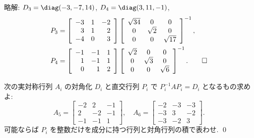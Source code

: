 \documentclass[12pt,twoside]{jarticle}
\newcommand\commentout[1]{#1}
\newcommand\commentout[1]{}
\begin{document}
\commentout{
\noindent
略解: $D_3=\diag(-3,-7,14)$, $D_4=\diag(3,11,-1)$, 
\begin{align*}
  &
  P_3 = 
  \left[ 
    \begin{array}{rrr}
      -3 & 1 & -2 \\
      3 & 1 & 2 \\
      -4 & 0 & 3
    \end{array}
  \right]
  \left[ 
    \begin{array}{ccc}
      \sqrt {34} & 0 & 0 \\
      0 & \sqrt {2} & 0 \\
      0 & 0 & \sqrt {17}
    \end{array}
  \right]^{-1},
  \\ &
  P_4 =
  \left[ 
    \begin{array}{rrr}
      -1 & -1 & 1 \\
      1 & -1 & 1 \\
      0 & 1 & 2
    \end{array}
  \right]
  \left[ 
    \begin{array}{ccc}
      \sqrt {2} & 0 & 0 \\
      0 & \sqrt {3} & 0 \\
      0 & 0 & \sqrt {6}
    \end{array}
  \right]^{-1}.
  \qed
\end{align*}
}


\begin{question}
\label{q:ars-3}
  次の実対称行列 $A_i$ の対角化 $D_i$ と直交行列 $P_i$ で $P_i^{-1}AP_i=D_i$ 
  となるもの求めよ:
  \begin{equation*}
    A_5 =
    \left[ 
      \begin{array}{rrr}
        -2 & 2 & -1 \\
        2 & -2 & -1 \\
        -1 & -1 & 1
      \end{array}
    \right],
    \quad
    A_6 =
    \left[ 
      \begin{array}{rrr}
        -2 & -3 & -3 \\
        -3 & 3 & -2 \\
        -3 & -2 & 3
      \end{array}
    \right].
  \end{equation*}
  可能ならば $P_i$ を整数だけを成分に持つ行列と対角行列の積で表わせ.
  \qed
\end{question}
\end{document}
